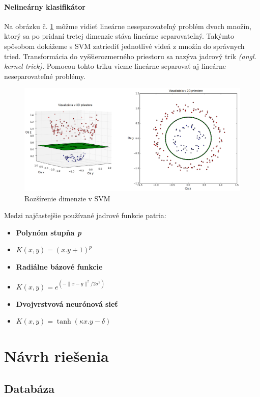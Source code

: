 \paragraph{Nelineárny klasifikátor}
Na obrázku č. \ref{SVMobr} môžme vidieť lineárne neseparovateľný problém dvoch množín, ktorý sa po pridaní tretej dimenzie stáva lineárne separovateľný. Takýmto spôsobom dokážeme s SVM zatriediť jednotlivé videá z množín do správnych tried. Transformácia do vyššierozmerného priestoru sa nazýva jadrový trik \textit{(angl. kernel trick)}. Pomocou tohto triku vieme lineárne separovať aj lineárne neseparovateľné problémy.\cite{c12}

\begin{figure}[!htbp]
  \centering
  \includegraphics[width=16cm]{img/SVM.png}
  \caption{Rozšírenie dimenzie v SVM}
  \label{SVMobr}
\end{figure}

Medzi najčastejšie používané jadrové funkcie patria:

\begin{itemize}
\item \textbf{Polynóm stupňa \textit{p}}
\item $  K(x,y) = (x.y + 1)^p $
\item \textbf{Radiálne bázové funkcie}
\item $   K(x,y) = e^{(-\|x-y\|^2/2\sigma^2)}  $
\item \textbf{Dvojvrstvová neurónová sieť }
\item $   K(x,y) = \tanh(\kappa x.y - \delta)  $
\end{itemize}

\section{Návrh riešenia}
\subsection{Databáza}


